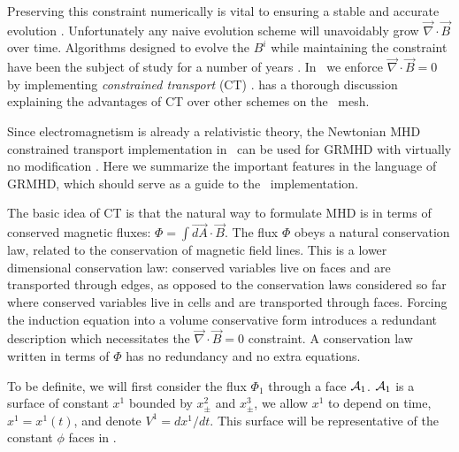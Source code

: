 Preserving this constraint numerically is vital to ensuring a stable and accurate evolution \citep{Brackbill80}.  Unfortunately any naive evolution scheme will unavoidably grow $\vec{\nabla}\cdot \vec{B}$ over time. Algorithms designed to evolve the $B^i$ while maintaining the constraint have been the subject of study for a number of years \citep{Evans88,Dai98,Ryu98,Balsara99,Toth00}.  In \grdisco\ we enforce $\vec{\nabla}\cdot \vec{B} = 0$ by implementing \emph{constrained transport} (CT) \citep{Evans88}.  \citet{Duffell16} has a thorough discussion explaining the advantages of CT over other schemes on the \disco\ mesh.

Since electromagnetism is already a relativistic theory, the Newtonian MHD constrained transport implementation in \disco\ can be used for GRMHD with virtually no modification \citep{Duffell16}.  Here we summarize the important features in the language of GRMHD, which should serve as a guide to the \grdisco\ implementation.

The basic idea of CT is that the natural way to formulate MHD is in terms of conserved magnetic fluxes: $\Phi = \int \vec{dA}\cdot \vec{B}$. The flux $\Phi$ obeys a natural conservation law, related to the conservation of magnetic field lines.  This is a lower dimensional conservation law: conserved variables live on faces and are transported through edges, as opposed to the conservation laws considered so far where conserved variables live in cells and are transported through faces.  Forcing the induction equation into a volume conservative form introduces a redundant description which necessitates the $\vec{\nabla}\cdot \vec{B} = 0$ constraint.  A conservation law written in terms of $\Phi$ has no redundancy and no extra equations.

To be definite, we will first consider the flux $\Phi_1$ through a face $\AA_1$.  $\AA_1$ is a surface of constant $x^1$ bounded by $x^2_\pm$ and $x^3_\pm$, we allow $x^1$ to depend on time, $x^1 = x^1(t)$, and denote $V^1 = d x^1/dt$.  This surface will be representative of the constant $\phi$ faces in \grdisco.

